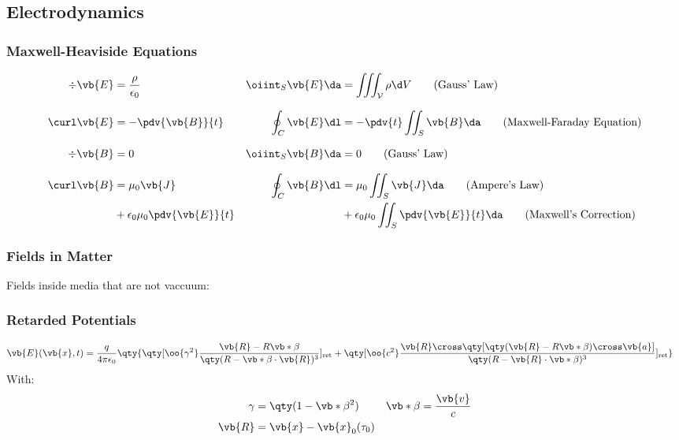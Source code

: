 \subsection{Electrodynamics}
\subsubsection{Maxwell-Heaviside Equations}
\begin{align*}
	\div\vb{E}&=\frac{\rho}{\epsilon_0}
	&
	\oiint_{S}\vb{E}\da&=\iiint_{\mathcal{V}}\rho\d V\tag{Gauss' Law}
	\\[0.25cm]
	\curl\vb{E}&=-\pdv{\vb{B}}{t}
	&
	\oint_{C}\vb{E}\dl&=-\pdv{t}\iint_{S}\vb{B}\da\tag{Maxwell-Faraday Equation}
	\\[0.25cm]
	\div\vb{B}&=0
	&
	\oiint_{S}\vb{B}\da&=0\tag{Gauss' Law}
	\\[0.25cm]
	\curl\vb{B}&=\mu_0\vb{J}
	&
	\oint_{C}\vb{B}\dl&=\mu_0\iint_{S}\vb{J}\da\tag{Ampere's Law}
	\\
	&+\epsilon_0\mu_0\pdv{\vb{E}}{t}&&+\epsilon_0\mu_0\iint_{S}\pdv{\vb{E}}{t}\da\tag{Maxwell's Correction}
\end{align*}
\subsubsection{Fields in Matter}
Fields inside media that are not vaccuum:
\subsubsection{Retarded Potentials}
\begin{align*}
	\vb{E}(\vb{x},t)&=\frac{q}{4\pi\epsilon_0}\qty{\qty[\oo{\gamma^2}\frac{\vb{R}-R\vb*{\beta}}{\qty(R-\vb*{\beta}\cdot\vb{R})^3}]_\text{ret}
	+\qty[\oo{c^2}\frac{\vb{R}\cross\qty[\qty(\vb{R}-R\vb*{\beta})\cross\vb{a}]}{\qty(R-\vb{R}\cdot\vb*{\beta})^3}]_\text{ret}}
\end{align*}
With:
\begin{align*}
	\gamma&=\qty(1-\vb*{\beta}^2)
	&
	\vb*{\beta}&=\frac{\vb{v}}{c}
	\\
	\vb{R}&=\vb{x}-\vb{x}_0(\tau_0)
\end{align*}
